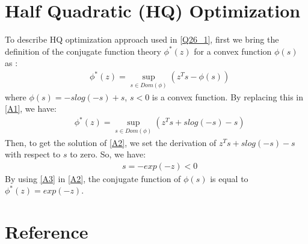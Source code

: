\documentclass{elsarticle}
\begin{document}
\section{Half Quadratic (HQ) Optimization}
To describe HQ optimization approach used in \eqref{Q26_1}, first we bring the definition of the conjugate function theory $\phi^*(z)$ for a convex function $\phi(s)$ as \cite{boyd2004convex}:
\begin{equation}\label{A1}
\begin{aligned}
&\phi^*(z)=\sup_{s\in Dom(\phi)}(z^Ts-\phi(s))
\end{aligned}
\end{equation}
where $\phi(s)=-slog(-s)+s$, $s<0$ is a convex function. By replacing this in \eqref{A1}, we have:
\begin{equation}\label{A2}
\begin{aligned}
&\phi^*(z)=\sup_{s\in Dom(\phi)}(z^Ts+slog(-s)-s)
\end{aligned}
\end{equation}
Then, to get the solution of \eqref{A2}, we set the derivation of $z^Ts+slog(-s)-s$ with respect to $s$ to zero. So, we have:
\begin{equation}\label{A3}
\begin{aligned}
&s=-exp(-z)<0
\end{aligned}
\end{equation}
By using \eqref{A3} in \eqref{A2}, the conjugate function of $\phi(s)$ is equal to $\phi^*(z)=exp(-z)$.
\section*{Reference}

\end{document}
